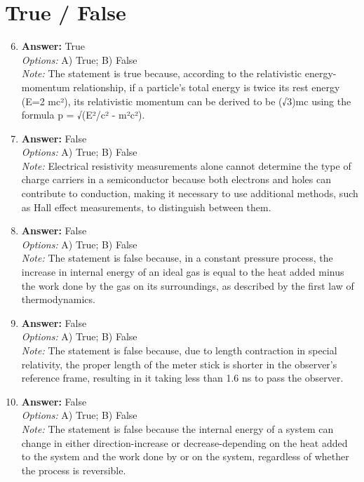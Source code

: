 \documentclass[12pt]{article}
\begin{document}
\section*{True / False}
\begin{enumerate}[label=\arabic*.]
\setcounter{enumi}{5}
\item \textbf{Answer:} True
\\ \textit{Options:} A) True; B) False
\\ \textit{Note:} The statement is true because, according to the relativistic energy-momentum relationship, if a particle's total energy is twice its rest energy (E=2 mc²), its relativistic momentum can be derived to be (√3)mc using the formula p = √(E²/c² - m²c²).
\item \textbf{Answer:} False
\\ \textit{Options:} A) True; B) False
\\ \textit{Note:} Electrical resistivity measurements alone cannot determine the type of charge carriers in a semiconductor because both electrons and holes can contribute to conduction, making it necessary to use additional methods, such as Hall effect measurements, to distinguish between them.
\item \textbf{Answer:} False
\\ \textit{Options:} A) True; B) False
\\ \textit{Note:} The statement is false because, in a constant pressure process, the increase in internal energy of an ideal gas is equal to the heat added minus the work done by the gas on its surroundings, as described by the first law of thermodynamics.
\item \textbf{Answer:} False
\\ \textit{Options:} A) True; B) False
\\ \textit{Note:} The statement is false because, due to length contraction in special relativity, the proper length of the meter stick is shorter in the observer's reference frame, resulting in it taking less than 1.6 ns to pass the observer.
\item \textbf{Answer:} False
\\ \textit{Options:} A) True; B) False
\\ \textit{Note:} The statement is false because the internal energy of a system can change in either direction-increase or decrease-depending on the heat added to the system and the work done by or on the system, regardless of whether the process is reversible.
\end{enumerate}
\end{document}
